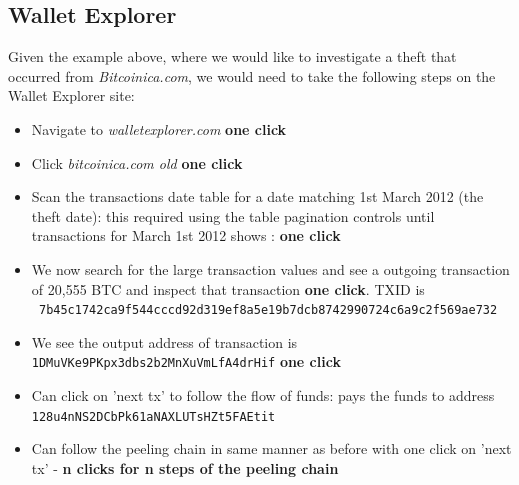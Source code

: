 \subsection{Wallet Explorer}
Given the example above, where we would like to investigate a theft that occurred from \textit{Bitcoinica.com}, we would need to take the following steps on the Wallet Explorer site:
\begin{itemize}
    \item Navigate to \textit{walletexplorer.com} \textbf{one click}
    \item Click \textit{bitcoinica.com old} \textbf{one click}
    \item Scan the transactions date table for a date matching 1st March 2012 (the theft date): this required using the table pagination controls until transactions for March 1st 2012 shows : \textbf{one click}
    \item We now search for the large transaction values and see a outgoing transaction of 20,555 BTC and inspect that transaction \textbf{one click}. TXID is \\\texttt{    7b45c1742ca9f544cccd92d319ef8a5e19b7dcb8742990724c6a9c2f569ae732}
    \item We see the output address of transaction is \texttt{ 1DMuVKe9PKpx3dbs2b2MnXuVmLfA4drHif} \textbf{one click}
    \item Can click on 'next tx' to follow the flow of funds: pays the funds to address \\\texttt{128u4nNS2DCbPk61aNAXLUTsHZt5FAEtit}
    \item Can follow the peeling chain in same manner as before with one click on 'next tx' - \textbf{n clicks for n steps of the peeling chain}
\end{itemize}

